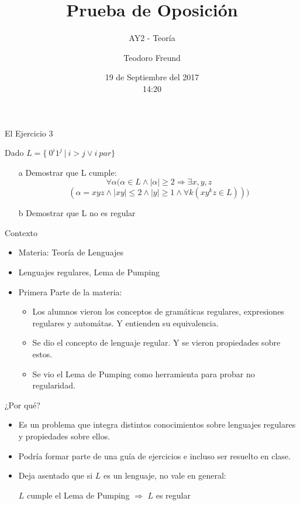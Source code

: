 \documentclass[presentation
]{beamer}
\title{Prueba de Oposición}
\subtitle{AY2 - Teoría}
\author{\large{Teodoro Freund}}
\date{19 de Septiembre del 2017 \\ \footnotesize{14:20}} %
\begin{document}
\begin{frame}
\titlepage
\end{frame}



\begin{frame}{El Ejercicio 3}

Dado $L = \{~0^i1^j ~| ~i>j \lor i~ par\}$

\begin{itemize}
\item[a] Demostrar que L cumple: 
$$ \forall \alpha (\alpha \in L \land |\alpha| \geq 2 \Rightarrow \exists x, y, z $$ 
$$  (\alpha = xyz \land |xy| \leq 2 \land |y| \geq 1 \land \forall k (xy^kz \in L))) $$

\item[b] Demostrar que L no es regular
\end{itemize}

 

\end{frame}


\begin{frame}{Contexto}
\begin{itemize}
\item Materia: Teoría de Lenguajes
\pause
\item Lenguajes regulares, Lema de Pumping
\pause

\item Primera Parte de la materia:
\begin{itemize}
\item Los alumnos vieron los conceptos de gramáticas regulares, expresiones regulares y automátas. Y entienden su equivalencia.
\item Se dio el concepto de lenguaje regular. Y se vieron propiedades sobre estos.
\item Se vio el Lema de Pumping como herramienta para probar no regularidad.
\end{itemize}


\end{itemize}

\end{frame}

\begin{frame}{¿Por qué?}

\begin{itemize}
\item Es un problema que integra distintos conocimientos sobre lenguajes regulares y propiedades sobre ellos.

\item Podría formar parte de una guía de ejercicios e incluso ser resuelto en clase.

\item Deja asentado que si $L$ es un lenguaje, no vale en general:

\begin{center}

$L$ cumple el Lema de Pumping $\Rightarrow$ $L$ es regular
\end{center}


\end{itemize}

\end{frame}
\end{document}
